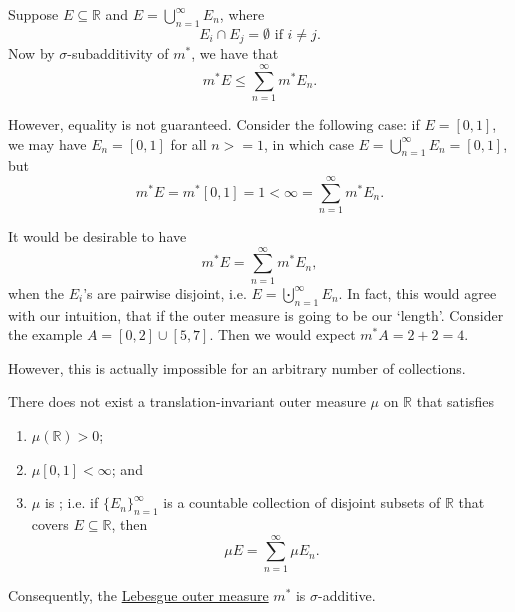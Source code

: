 \documentclass[notoc,notitlepage]{tufte-book}
\begin{document}
\begin{remark}
  Suppose $E \subseteq \mathbb{R}$ and $E = \bigcup_{n=1}^{\infty} E_n$,
  where
  \begin{equation*}
    E_i \cap E_j = \emptyset \text{ if } i \neq j.
  \end{equation*}
  Now by $\sigma$-subadditivity of $m^*$, we have that
  \begin{equation*}
    m^* E \leq \sum_{n=1}^{\infty} m^* E_n.
  \end{equation*}

  However, equality is not guaranteed. Consider the following case: if $E = [0,
  1]$, we may have $E_n = [0, 1]$ for all $n >= 1$, in which case $E =
  \bigcup_{n=1}^{\infty} E_n = [0, 1]$, but
  \begin{equation*}
    m^* E = m^* [0, 1] = 1 < \infty = \sum_{n=1}^{\infty} m^* E_n.
  \end{equation*}

  It would be desirable to have
  \begin{equation*}
    m^* E = \sum_{n=1}^{\infty} m^* E_n,
  \end{equation*}
  when the $E_i$'s are pairwise disjoint, i.e. $E = \bigcupdot_{n=1}^{\infty}
  E_n$. In fact, this would agree with our intuition, that if the outer measure
  is going to be our `length'. Consider the example $A = [0, 2] \cup [5, 7]$.
  Then we would expect $m^* A = 2 + 2 = 4$.

  However, this is actually impossible for an arbitrary number of collections.
\end{remark}

\begin{thm}\label{thm:non_existence_of_a_sensible_translation_invariant_outer_measure_that_is_also_sigma_additive}
  There does not exist a translation-invariant outer measure $\mu$ on
  $\mathbb{R}$ that satisfies
  \begin{enumerate}
    \item $\mu(\mathbb{R}) > 0$;
    \item $\mu[0, 1] < \infty$; and
    \item $\mu$ is ; i.e. if $\{ E_n
      \}_{n=1}^{\infty}$ is a countable collection of disjoint subsets of
      $\mathbb{R}$ that covers $E \subseteq \mathbb{R}$, then
      \begin{equation*}
        \mu E = \sum_{n=1}^{\infty} \mu E_n.
      \end{equation*}
  \end{enumerate}
  Consequently, the \hyperref[defn:lebesgue_outer_measure]{Lebesgue outer
  measure} $m^*$ is  $\sigma$-additive.
\end{thm}
\end{document}
